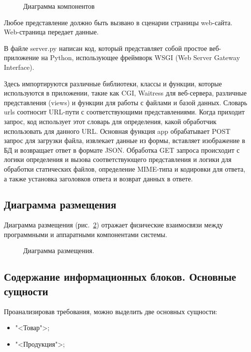 \begin{figure}[ht]
\caption{Диаграмма компонентов}
\label{comp:image}
\end{figure}

Любое представление должно быть вызвано в сценарии страницы web-сайта. Web-страница передает данные.


В файле server.py написан код, который представляет собой простое веб-приложение на Python, использующее фреймворк WSGI (Web Server Gateway Interface).

Здесь импортируются различные библиотеки, классы и функции, которые используются в приложении, такие как CGI, Waitress для веб-сервера, различные представления (views) и функции для работы с файлами и базой данных. Словарь urls соотносит URL-пути с соответствующими представлениями. Когда приходит запрос, код использует этот словарь для определения, какой обработчик использовать для данного URL. Основная функция app обрабатывает POST запрос для загрузки файла, извлекает данные из формы, вставляет изображение в БД и возвращает ответ в формате JSON. Обработка GET запроса происходит с логики определения и вызова соответствующего представления и логики для обработки статических файлов, определение MIME-типа и кодировки для ответа, а также установка заголовков ответа и возврат данных в ответе.

\subsection{Диаграмма размещения}

Диаграмма размещения (рис.~\ref{place:image}) отражает физические взаимосвязи между программными и аппаратными компонентами системы.

\vspace{-8mm} %
\begin{figure}[ht]
\caption{Диаграмма размещения.}
\label{place:image}
\end{figure}



\subsection{Содержание информационных блоков. Основные сущности}

Проанализировав требования, можно выделить две основных сущности:
\begin{itemize}
\item "<Товар">;
\item "<Продукция">;
\end{itemize}

